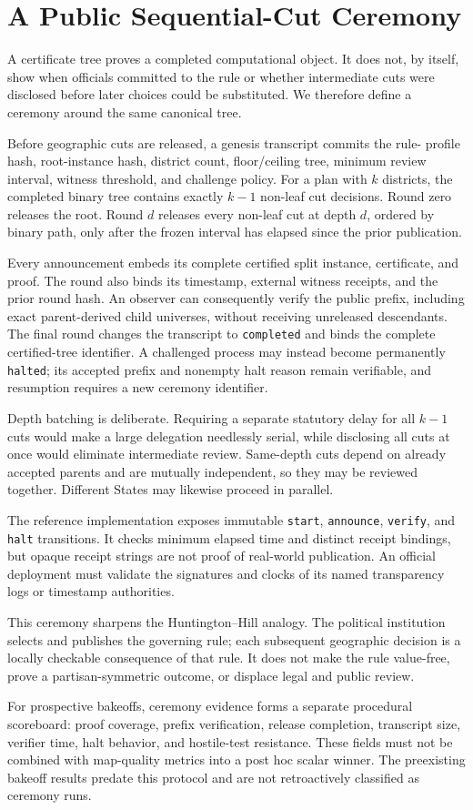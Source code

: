\section{A Public Sequential-Cut Ceremony}
\label{sec:ceremony}

A certificate tree proves a completed computational object. It does not, by
itself, show when officials committed to the rule or whether intermediate cuts
were disclosed before later choices could be substituted. We therefore define
a ceremony around the same canonical tree.

Before geographic cuts are released, a genesis transcript commits the rule-
profile hash, root-instance hash, district count, floor/ceiling tree, minimum
review interval, witness threshold, and challenge policy. For a plan with $k$
districts, the completed binary tree contains exactly $k-1$ non-leaf cut
decisions. Round zero releases the root. Round $d$ releases every non-leaf cut
at depth $d$, ordered by binary path, only after the frozen interval has elapsed
since the prior publication.

Every announcement embeds its complete certified split instance, certificate,
and proof. The round also binds its timestamp, external witness receipts, and
the prior round hash. An observer can consequently verify the public prefix,
including exact parent-derived child universes, without receiving unreleased
descendants. The final round changes the transcript to \texttt{completed} and
binds the complete certified-tree identifier. A challenged process may instead
become permanently \texttt{halted}; its accepted prefix and nonempty halt reason
remain verifiable, and resumption requires a new ceremony identifier.

Depth batching is deliberate. Requiring a separate statutory delay for all
$k-1$ cuts would make a large delegation needlessly serial, while disclosing
all cuts at once would eliminate intermediate review. Same-depth cuts depend on
already accepted parents and are mutually independent, so they may be reviewed
together. Different States may likewise proceed in parallel.

The reference implementation exposes immutable \texttt{start},
\texttt{announce}, \texttt{verify}, and \texttt{halt} transitions. It checks
minimum elapsed time and distinct receipt bindings, but opaque receipt strings
are not proof of real-world publication. An official deployment must validate
the signatures and clocks of its named transparency logs or timestamp
authorities.

This ceremony sharpens the Huntington--Hill analogy. The political institution
selects and publishes the governing rule; each subsequent geographic decision
is a locally checkable consequence of that rule. It does not make the rule
value-free, prove a partisan-symmetric outcome, or displace legal and public
review.

For prospective bakeoffs, ceremony evidence forms a separate procedural
scoreboard: proof coverage, prefix verification, release completion, transcript
size, verifier time, halt behavior, and hostile-test resistance. These fields
must not be combined with map-quality metrics into a post hoc scalar winner.
The preexisting bakeoff results predate this protocol and are not retroactively
classified as ceremony runs.
